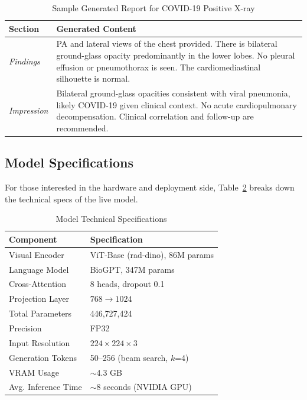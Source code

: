 \documentclass[conference]{IEEEtran}
\begin{document}
\begin{table}[htbp]
\centering
\caption{Sample Generated Report for COVID-19 Positive X-ray}
\label{tab:sample_report}
\footnotesize
\begin{tabular}{@{}p{1.5cm}p{6cm}@{}}
\toprule
\textbf{Section} & \textbf{Generated Content} \\
\midrule
\textit{Findings} & PA and lateral views of the chest provided. There is bilateral ground-glass opacity predominantly in the lower lobes. No pleural effusion or pneumothorax is seen. The cardiomediastinal silhouette is normal. \\
\addlinespace
\textit{Impression} & Bilateral ground-glass opacities consistent with viral pneumonia, likely COVID-19 given clinical context. No acute cardiopulmonary decompensation. Clinical correlation and follow-up are recommended. \\
\bottomrule
\end{tabular}
\end{table}

\subsection{Model Specifications}
For those interested in the hardware and deployment side, Table~\ref{tab:model_specs} breaks down the technical specs of the live model.

\begin{table}[htbp]
\centering
\caption{Model Technical Specifications}
\label{tab:model_specs}
\begin{tabular}{@{}ll@{}}
\toprule
\textbf{Component} & \textbf{Specification} \\
\midrule
Visual Encoder & ViT-Base (rad-dino), 86M params \\
Language Model & BioGPT, 347M params \\
Cross-Attention & 8 heads, dropout 0.1 \\
Projection Layer & $768 \rightarrow 1024$ \\
Total Parameters & 446,727,424 \\
Precision & FP32 \\
Input Resolution & $224 \times 224 \times 3$ \\
Generation Tokens & 50--256 (beam search, $k$=4) \\
VRAM Usage & $\sim$4.3 GB \\
Avg. Inference Time & $\sim$8 seconds (NVIDIA GPU) \\
\bottomrule
\end{tabular}
\end{table}
\end{document}
